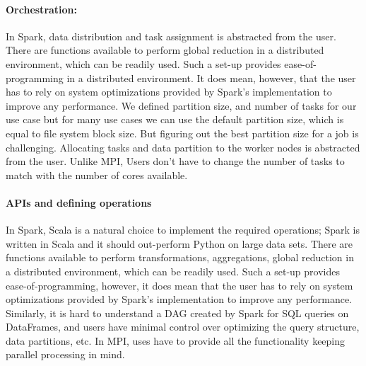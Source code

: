 \documentclass[10pt, twocolumn]{article}
\newcommand{\squeezeup}{\vspace{-5.5mm}}
\begin{document}

\squeezeup
 \paragraph{Orchestration: } 
In Spark, data distribution and task assignment
  is abstracted from the user. There are functions available to
  perform global reduction in a distributed environment, which can be
  readily used.  Such a set-up provides ease-of-programming in a
  distributed environment. It does mean, however, that the user has to
  rely on system optimizations provided by Spark's implementation to
  improve any performance.
  We defined partition size, and number 
of tasks for our use case but for many use cases we can use the 
default partition size, which is equal to file system block size. 
But figuring out the best partition size for a job is challenging. 
Allocating tasks and data partition to the worker nodes is abstracted 
from the user. Unlike MPI, Users don't have to change the number of tasks to match 
with the number of cores available. 

\squeezeup
\paragraph{APIs and defining operations} 
In Spark, Scala is a natural choice to implement the required operations; Spark is written in Scala 
and it should out-perform Python on large data sets.  
 There are functions available to
  perform transformations, aggregations, global reduction in a distributed environment, which can be
  readily used. Such a set-up provides ease-of-programming, however, it does mean that the user has to
  rely on system optimizations provided by Spark's implementation to
  improve any performance. 
Similarly, it is hard to understand a DAG created by Spark for SQL queries on 
DataFrames, and users have minimal control over optimizing the 
query structure, data partitions, etc. In MPI, uses have to provide all the functionality keeping 
parallel processing in mind. 
\end{document}
